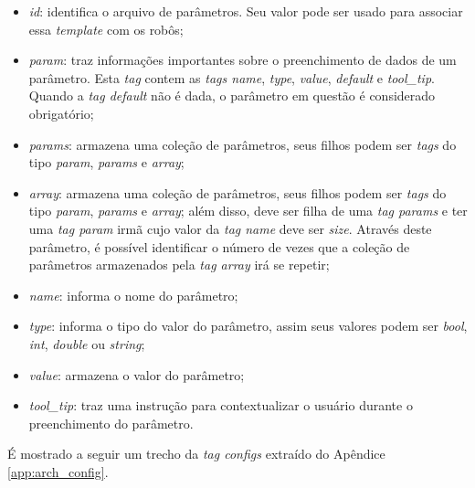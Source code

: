             \begin{itemize}
                \item \textit{id}: identifica o arquivo de parâmetros. Seu valor pode ser usado para associar essa \textit{template} com os robôs;
                
                \item \textit{param}: traz informações importantes sobre o preenchimento de dados de um parâmetro. Esta \textit{tag} contem as \textit{tags name}, \textit{type}, \textit{value}, \textit{default} e \textit{tool\_tip}. Quando a \textit{tag default} não é dada, o parâmetro em questão é considerado obrigatório;
                
                \item \textit{params}: armazena uma coleção de parâmetros, seus filhos podem ser \textit{tags} do tipo \textit{param}, \textit{params} e \textit{array};
                
                \item \textit{array}: armazena uma coleção de parâmetros, seus filhos podem ser \textit{tags} do tipo \textit{param}, \textit{params} e \textit{array}; além disso, deve ser filha de uma \textit{tag params} e ter uma \textit{tag param} irmã cujo valor da \textit{tag name} deve ser \textit{size}. Através deste parâmetro, é possível identificar o número de vezes que a coleção de parâmetros armazenados pela \textit{tag array} irá se repetir;
                
                \item \textit{name}: informa o nome do parâmetro;
                
                \item \textit{type}: informa o tipo do valor do parâmetro, assim seus valores podem ser \textit{bool}, \textit{int}, \textit{double} ou \textit{string};
                
                \item \textit{value}: armazena o valor do parâmetro;
                
                \item \textit{tool\_tip}: traz uma instrução para contextualizar o usuário durante o preenchimento do parâmetro.
            \end{itemize}
            É mostrado a seguir um trecho da \textit{tag configs} extraído do Apêndice \ref{app:arch_config}.
            
